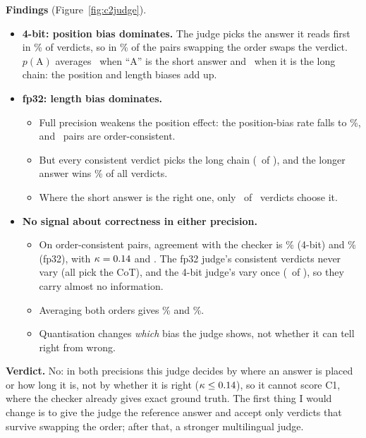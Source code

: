 \textbf{Findings} (Figure~\ref{fig:c2judge}).
\begin{itemize}[leftmargin=*,nosep]
\item \textbf{4-bit: position bias dominates.} The judge picks the answer it reads first in \CTwoFirst\% of verdicts, so in \CTwoPosBias\% of the pairs swapping the order swaps the verdict. $p(\text{A})$ averages \QPaDirectFirst\ when ``A'' is the short answer and \QPaCotFirst\ when it is the long chain: the position and length biases add up.
\item \textbf{fp32: length bias dominates.}
\begin{itemize}[leftmargin=*,nosep]
\item Full precision weakens the position effect: the position-bias rate falls to \FpPosBias\%, and \FpConsistent\ pairs are order-consistent.
\item But every consistent verdict picks the long chain (\FpConsCot\ of \FpConsistent), and the longer answer wins \FpLonger\% of all verdicts.
\item Where the short answer is the right one, only \FpShortRight\ of \FpShortN\ verdicts choose it.
\end{itemize}
\item \textbf{No signal about correctness in either precision.}
\begin{itemize}[leftmargin=*,nosep]
\item On order-consistent pairs, agreement with the checker is \CTwoAgree\% (4-bit) and \FpAgree\% (fp32), with $\kappa=0.14$ and \FpKappa. The fp32 judge's consistent verdicts never vary (all pick the CoT), and the 4-bit judge's vary once (\CTwoConsDirect\ of \CTwoConsistent), so they carry almost no information.
\item Averaging both orders gives \CTwoAvgAgree\% and \FpAvgAgree\%.
\item Quantisation changes \emph{which} bias the judge shows, not whether it can tell right from wrong.
\end{itemize}
\end{itemize}

\textbf{Verdict.} No: in both precisions this judge decides by where an answer is placed or how long it is, not by whether it is right ($\kappa\le0.14$), so it cannot score C1, where the checker already gives exact ground truth. The first thing I would change is to give the judge the reference answer and accept only verdicts that survive swapping the order; after that, a stronger multilingual judge.
